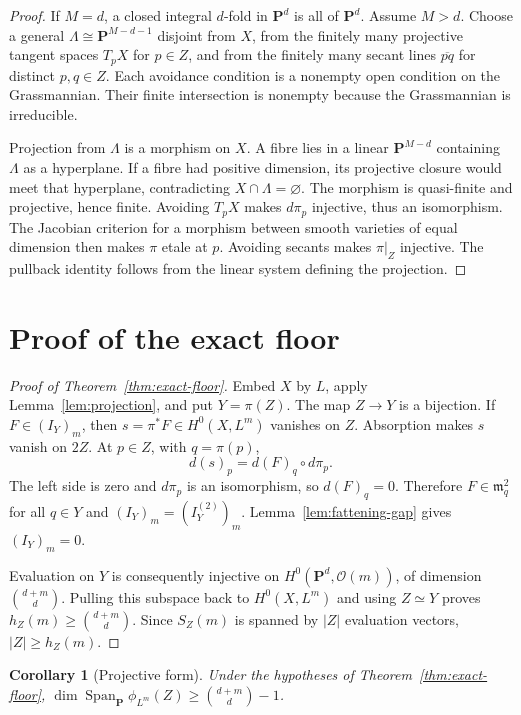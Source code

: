 \documentclass[11pt]{article}
\newtheorem{corollary}[theorem]{Corollary}
\newcommand{\PP}{\mathbf P}
\newcommand{\cO}{\mathcal O}
\newcommand{\Span}{\operatorname{Span}}
\begin{document}
\begin{proof}
If $M=d$, a closed integral $d$-fold in $\PP^d$ is all of $\PP^d$.
Assume $M>d$.  Choose a general
$\Lambda\cong\PP^{M-d-1}$ disjoint from $X$, from the finitely many
projective tangent spaces $T_pX$ for $p\in Z$, and from the finitely many
secant lines $\overline{pq}$ for distinct $p,q\in Z$.  Each avoidance
condition is a nonempty open condition on the Grassmannian.  Their finite
intersection is nonempty because the Grassmannian is irreducible.

Projection from $\Lambda$ is a morphism on $X$.  A fibre lies in a linear
$\PP^{M-d}$ containing $\Lambda$ as a hyperplane.  If a fibre had positive
dimension, its projective closure would meet that hyperplane, contradicting
$X\cap\Lambda=\varnothing$.  The morphism is quasi-finite and projective,
hence finite.  Avoiding $T_pX$ makes $d\pi_p$ injective, thus an isomorphism.
The Jacobian criterion for a morphism between smooth varieties of equal
dimension then makes $\pi$ etale at $p$.  Avoiding secants makes $\pi|_Z$
injective.  The pullback identity follows from the linear system defining the
projection.
\end{proof}

\section{Proof of the exact floor}\label{sec:exact-proof}

\begin{proof}[Proof of Theorem~\ref{thm:exact-floor}]
Embed $X$ by $L$, apply Lemma~\ref{lem:projection}, and put $Y=\pi(Z)$.
The map $Z\to Y$ is a bijection.  If $F\in(I_Y)_m$, then
$s=\pi^*F\in H^0(X,L^m)$ vanishes on $Z$.  Absorption makes $s$ vanish on
$2Z$.  At $p\in Z$, with $q=\pi(p)$,
\[
 d(s)_p=d(F)_q\circ d\pi_p.
\]
The left side is zero and $d\pi_p$ is an isomorphism, so $d(F)_q=0$.
Therefore $F\in\mathfrak m_q^2$ for all $q\in Y$ and
$(I_Y)_m=(I_Y^{(2)})_m$.  Lemma~\ref{lem:fattening-gap} gives
$(I_Y)_m=0$.

Evaluation on $Y$ is consequently injective on
$H^0(\PP^d,\cO(m))$, of dimension $\binom{d+m}{d}$.  Pulling this subspace
back to $H^0(X,L^m)$ and using $Z\simeq Y$ proves
$h_Z(m)\geq\binom{d+m}{d}$.  Since $S_Z(m)$ is spanned by $|Z|$ evaluation
vectors, $|Z|\geq h_Z(m)$.
\end{proof}

\begin{corollary}[Projective form]
Under the hypotheses of Theorem~\ref{thm:exact-floor},
$\dim\Span_{\PP}\phi_{L^m}(Z)\geq\binom{d+m}{d}-1$.
\end{corollary}
\end{document}
